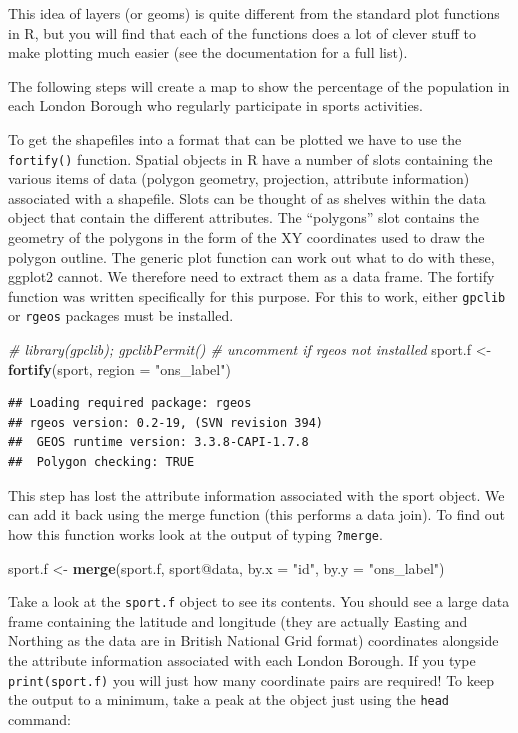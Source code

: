\documentclass[]{article}
\newenvironment{Shaded}{}{}
\newcommand{\KeywordTok}[1]{\textcolor[rgb]{0.00,0.44,0.13}{\textbf{{#1}}}}
\newcommand{\DataTypeTok}[1]{\textcolor[rgb]{0.56,0.13,0.00}{{#1}}}
\newcommand{\StringTok}[1]{\textcolor[rgb]{0.25,0.44,0.63}{{#1}}}
\newcommand{\CommentTok}[1]{\textcolor[rgb]{0.38,0.63,0.69}{\textit{{#1}}}}
\newcommand{\NormalTok}[1]{{#1}}
\begin{document}
This idea of layers (or geoms) is quite different from the standard plot
functions in R, but you will find that each of the functions does a lot
of clever stuff to make plotting much easier (see the documentation for
a full list).

The following steps will create a map to show the percentage of the
population in each London Borough who regularly participate in sports
activities.

To get the shapefiles into a format that can be plotted we have to use
the \texttt{fortify()} function. Spatial objects in R have a number of
slots containing the various items of data (polygon geometry,
projection, attribute information) associated with a shapefile. Slots
can be thought of as shelves within the data object that contain the
different attributes. The ``polygons'' slot contains the geometry of the
polygons in the form of the XY coordinates used to draw the polygon
outline. The generic plot function can work out what to do with these,
ggplot2 cannot. We therefore need to extract them as a data frame. The
fortify function was written specifically for this purpose. For this to
work, either \texttt{gpclib} or \texttt{rgeos} packages must be
installed.

\begin{Shaded}
\begin{Highlighting}[]
\CommentTok{# library(gpclib); gpclibPermit() # uncomment if rgeos not installed}
\NormalTok{sport.f <- }\KeywordTok{fortify}\NormalTok{(sport, }\DataTypeTok{region =} \StringTok{"ons_label"}\NormalTok{)}
\end{Highlighting}
\end{Shaded}
\begin{verbatim}
## Loading required package: rgeos
## rgeos version: 0.2-19, (SVN revision 394)
##  GEOS runtime version: 3.3.8-CAPI-1.7.8 
##  Polygon checking: TRUE
\end{verbatim}
This step has lost the attribute information associated with the sport
object. We can add it back using the merge function (this performs a
data join). To find out how this function works look at the output of
typing \texttt{?merge}.

\begin{Shaded}
\begin{Highlighting}[]
\NormalTok{sport.f <- }\KeywordTok{merge}\NormalTok{(sport.f, sport@data, }\DataTypeTok{by.x =} \StringTok{"id"}\NormalTok{, }\DataTypeTok{by.y =} \StringTok{"ons_label"}\NormalTok{)}
\end{Highlighting}
\end{Shaded}
Take a look at the \texttt{sport.f} object to see its contents. You
should see a large data frame containing the latitude and longitude
(they are actually Easting and Northing as the data are in British
National Grid format) coordinates alongside the attribute information
associated with each London Borough. If you type \texttt{print(sport.f)}
you will just how many coordinate pairs are required! To keep the output
to a minimum, take a peak at the object just using the \texttt{head}
command:
\end{document}
